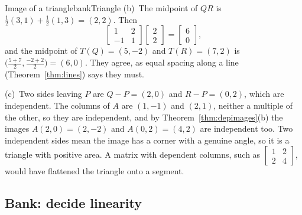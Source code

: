 \documentclass[11pt]{article}
\begin{document}
\begin{exmp}{Image of a triangle}{bankTriangle}
(b)~The midpoint of $QR$ is $\tfrac12(3,1)+\tfrac12(1,3)=(2,2)$. Then
\[
\begin{bmatrix}1&2\\-1&1\end{bmatrix}\begin{bmatrix}2\\2\end{bmatrix}=\begin{bmatrix}6\\0\end{bmatrix},
\]
and the midpoint of $T(Q)=(5,-2)$ and $T(R)=(7,2)$ is $\bigl(\tfrac{5+7}{2},\tfrac{-2+2}{2}\bigr)=(6,0)$. They agree, as equal spacing along a line (Theorem~\ref{thm:lines}) says they must.

(c)~Two sides leaving $P$ are $Q-P=(2,0)$ and $R-P=(0,2)$, which are independent. The columns of $A$ are $(1,-1)$ and $(2,1)$, neither a multiple of the other, so they are independent, and by Theorem~\ref{thm:depimages}(b) the images $A(2,0)=(2,-2)$ and $A(0,2)=(4,2)$ are independent too. Two independent sides mean the image has a corner with a genuine angle, so it is a triangle with positive area. A matrix with dependent columns, such as $\begin{bmatrix}1&2\\2&4\end{bmatrix}$, would have flattened the triangle onto a segment.
\end{exmp}

\subsection*{Bank: decide linearity}
\end{document}
